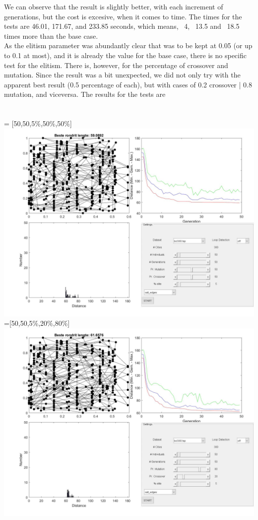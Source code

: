 We can observe that the result is slightly better, with each increment of
generations, but the cost is excesive, when it comes to time. The times for the
tests are 46.01, 171.67, and 233.85 seconds, which means, ~4, ~13.5 and ~18.5
times more than the base case.
\\
As the elitism parameter was abundantly clear that was to be kept at 0.05 (or
up to 0.1 at most), and it is already the value for the base case, there is
no specific test for the elitism. There is, however, for the percentage of
crossover and mutation. Since the result was a bit unexpected, we did not only
try with the apparent best result (0.5 percentage of each), but with cases of
0.2 crossover | 0.8 mutation, and viceversa. The results for the tests are\\
\\
\\
 = [50,50,5\%,50\%,50\%] \\
\includegraphics[width=\textwidth]{img/specific/xalt_edges/general_6.jpg}\\
 =[50,50,5\%,20\%,80\%] \\
\includegraphics[width=\textwidth]{img/specific/xalt_edges/general_7.jpg}\\
